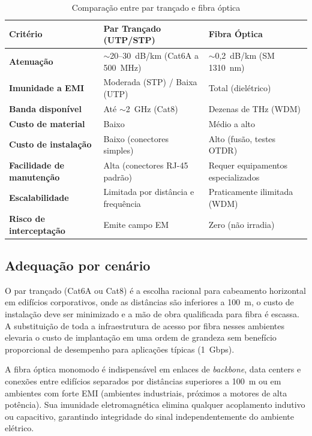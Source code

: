 \documentclass[conference]{IEEEtran}
\begin{document}
\begin{table}[h!]
\renewcommand{\arraystretch}{1.3}
\caption{Comparação entre par trançado e fibra óptica}
\label{tab:comparacao}
\centering
\begin{tabular}{>{\bfseries}p{2.2cm} p{2.5cm} p{2.5cm}}
\toprule
\textbf{Critério} & \textbf{Par Trançado (UTP/STP)} & \textbf{Fibra Óptica} \\
\midrule
Atenuação & $\sim$20--30~dB/km (Cat6A a 500~MHz) & $\sim$0,2~dB/km (SM 1310~nm) \\
\midrule
Imunidade a EMI & Moderada (STP) / Baixa (UTP) & Total (dielétrico) \\
\midrule
Banda disponível & Até $\sim$2~GHz (Cat8) & Dezenas de THz (WDM) \\
\midrule
Custo de material & Baixo & Médio a alto \\
\midrule
Custo de instalação & Baixo (conectores simples) & Alto (fusão, testes OTDR) \\
\midrule
Facilidade de manutenção & Alta (conectores RJ-45 padrão) & Requer equipamentos especializados \\
\midrule
Escalabilidade & Limitada por distância e frequência & Praticamente ilimitada (WDM) \\
\midrule
Risco de interceptação & Emite campo EM & Zero (não irradia) \\
\bottomrule
\end{tabular}
\end{table}

\subsection*{Adequação por cenário}

O par trançado (Cat6A ou Cat8) é a escolha racional para cabeamento horizontal em edifícios
corporativos, onde as distâncias são inferiores a 100~m, o custo de instalação deve ser
minimizado e a mão de obra qualificada para fibra é escassa. A substituição de toda a
infraestrutura de acesso por fibra nesses ambientes elevaria o custo de implantação em uma
ordem de grandeza sem benefício proporcional de desempenho para aplicações típicas (1~Gbps).

A fibra óptica monomodo é indispensável em enlaces de \textit{backbone}, data centers e
conexões entre edifícios separados por distâncias superiores a 100~m ou em ambientes com
forte EMI (ambientes industriais, próximos a motores de alta potência). Sua imunidade
eletromagnética elimina qualquer acoplamento indutivo ou capacitivo, garantindo integridade
do sinal independentemente do ambiente elétrico.
\end{document}
